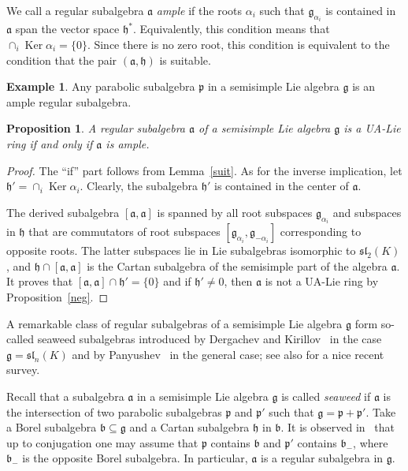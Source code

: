\documentclass[a4paper,draft,reqno,12pt]{amsart}
\newtheorem{proposition}{Proposition}
\theoremstyle{definition}
\newtheorem{example}{Example}
\theoremstyle{remark}
\DeclareMathOperator{\Ker}{Ker}
\def\ggg{\mathfrak{g}}
\def\hhh{\mathfrak{h}}
\def\ppp{\mathfrak{p}}
\def\bbb{\mathfrak{b}}
\def\aaa{\mathfrak{a}}
\def\sl{\mathfrak{sl}}
\begin{document}
We call a regular subalgebra $\aaa$ \emph{ample} if the roots $\alpha_i$ such that $\ggg_{\alpha_i}$ is contained in $\aaa$ span the vector space $\hhh^*$. Equivalently, this condition means that $\cap_i\Ker\alpha_i=\{0\}$.  Since there is no zero root, this condition is equivalent to the condition that the pair $(\aaa,\hhh)$ is suitable. 

\begin{example}
Any parabolic subalgebra $\ppp$ in a semisimple Lie algebra $\ggg$ is an ample regular subalgebra. 
\end{example}


\begin{proposition}
\label{reg}
A regular subalgebra $\aaa$ of a semisimple Lie algebra $\ggg$ is a UA-Lie ring if and only if $\aaa$ is ample. 
\end{proposition}

\begin{proof}
The ``if'' part follows from Lemma~\ref{suit}. As for the inverse implication, let $\hhh'=\cap_i\Ker\alpha_i$. Clearly, the subalgebra $\hhh'$ is contained in the center of $\aaa$. 

The derived subalgebra $[\aaa,\aaa]$ is spanned by all root subspaces $\ggg_{\alpha_i}$ and subspaces in $\hhh$ that are commutators of root subspaces $[\ggg_{\alpha_i},\ggg_{-\alpha_i}]$ corresponding to opposite roots. The latter subspaces lie in Lie subalgebras isomorphic to $\sl_2(K)$, and $\hhh\cap [\aaa,\aaa]$ is the Cartan subalgebra of the semisimple part of the algebra $\aaa$. It proves that $[\aaa,\aaa]\cap\hhh'=\{0\}$ and if $\hhh'\ne 0$, then $\aaa$ is not a UA-Lie ring by Proposition~\ref{neg}. 
\end{proof} 

A remarkable class of regular subalgebras of a semisimple Lie algebra $\ggg$ form so-called seaweed subalgebras introduced by Dergachev and Kirillov~\cite{DK} in the case $\ggg=\sl_n(K)$ and by Panyushev~\cite{Pa} in the general case; see also \cite{CCMR} for a nice recent survey. 

Recall that a subalgebra $\aaa$ in a semisimple Lie algebra $\ggg$ is called \emph{seaweed} if $\aaa$ is the intersection of two parabolic subalgebras $\ppp$ and $\ppp'$ such that $\ggg=\ppp+\ppp'$. Take a Borel subalgebra $\bbb\subseteq\ggg$ and a Cartan subalgebra $\hhh$ in $\bbb$. It is observed in~\cite{Pa} that up to conjugation one may assume that $\ppp$ contains $\bbb$ and $\ppp'$ contains $\bbb_{-}$, where $\bbb_{-}$ is the opposite Borel subalgebra. In particular, $\aaa$ is a regular subalgebra in $\ggg$.  
\end{document}
